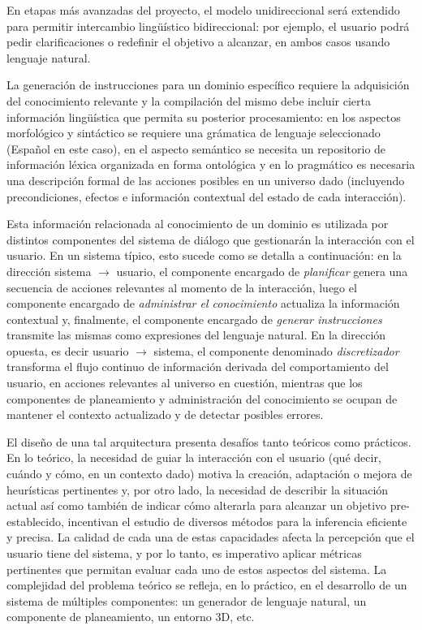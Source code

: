 En etapas m\'as avanzadas del proyecto, el modelo unidireccional ser\'a extendido para
permitir intercambio ling\"u\'istico bidireccional: por ejemplo, el usuario podr\'a
pedir clarificaciones o redefinir el objetivo a alcanzar, en ambos casos usando lenguaje natural.

La generaci\'on de instrucciones para un dominio espec\'ifico requiere la adquisici\'on del conocimiento relevante y la compilaci\'on del mismo debe incluir cierta informaci\'on  ling\"u\'istica que permita su posterior procesamiento: en los aspectos morfol\'ogico y sint\'actico se requiere una gr\'amatica de lenguaje seleccionado (Espa\~nol en este caso), en el aspecto sem\'antico se necesita un repositorio de informaci\'on l\'exica organizada en forma ontol\'ogica y en lo pragm\'atico es necesaria una descripci\'on formal de las
acciones posibles en un universo dado (incluyendo precondiciones, efectos e informaci\'on contextual del estado de cada interacci\'on).

Esta informaci\'on relacionada al conocimiento de un dominio es utilizada por distintos componentes del sistema de di\'alogo que
gestionar\'an la interacci\'on con el usuario. En un sistema t\'ipico, esto sucede como se detalla a continuaci\'on: en la direcci\'on sistema $\rightarrow$ usuario, el componente encargado de \textit{planificar} genera una secuencia de acciones relevantes al momento de la interacci\'on, luego el componente encargado de  \textit{administrar el conocimiento} actualiza la informaci\'on contextual y,  finalmente, el componente encargado de
\textit{generar instrucciones}  transmite las mismas como expresiones
del lenguaje natural.  En la direcci\'on opuesta, es decir usuario $\rightarrow$ sistema,  el componente denominado \textit{discretizador}
transforma el flujo continuo de informaci\'on derivada del comportamiento del usuario, en acciones relevantes al universo en cuesti\'on, mientras que
los componentes de planeamiento y administraci\'on del conocimiento se ocupan
de mantener el contexto actualizado y de detectar posibles errores.


El dise\~no de una tal arquitectura presenta
desaf\'ios tanto te\'oricos como pr\'acticos.  En lo te\'orico, la necesidad de
 guiar la interacci\'on con el usuario (qu\'e decir,
cu\'ando y c\'omo, en un contexto dado) motiva la creaci\'on, adaptaci\'on o mejora de heur\'isticas pertinentes y, por otro lado,  la necesidad de describir la situaci\'on actual as\'i como tambi\'en  de indicar c\'omo alterarla para alcanzar un objetivo pre-establecido, incentivan el estudio de diversos m\'etodos
para la inferencia eficiente y precisa.
La calidad de cada una de estas capacidades afecta la percepci\'on que
el usuario tiene del sistema, y por lo tanto, es imperativo aplicar m\'etricas pertinentes que permitan evaluar cada uno de estos aspectos del sistema.  La complejidad del problema te\'orico se
refleja, en lo pr\'actico, en el desarrollo de un sistema de m\'ultiples componentes: un
generador de lenguaje natural, un componente de planeamiento, un entorno 3D, etc.

